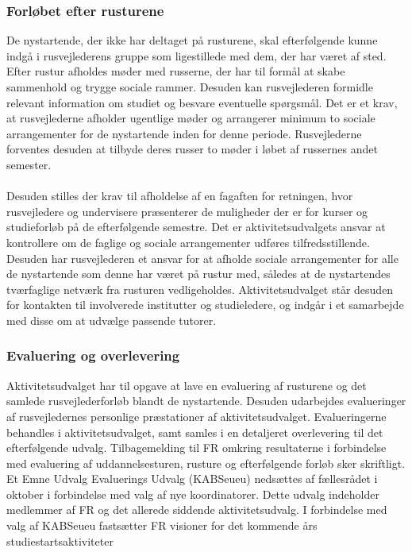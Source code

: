 \subsubsection{Forløbet efter rusturene}
De nystartende, der ikke har deltaget på rusturene, skal efterfølgende kunne indgå i rusvejlederens gruppe som ligestillede med dem, der har været af sted. Efter rustur afholdes møder med russerne, der har til formål at skabe sammenhold og trygge sociale rammer. Desuden kan rusvejlederen formidle relevant information om studiet og besvare eventuelle spørgsmål. Det er et krav, at rusvejlederne afholder ugentlige møder og arrangerer minimum to sociale arrangementer for de nystartende inden for denne periode. Rusvejlederne forventes desuden at tilbyde deres russer to møder i løbet af
russernes andet semester.\\
\\
Desuden stilles der krav til afholdelse af en fagaften for retningen, hvor rusvejledere og undervisere præsenterer de
muligheder der er for kurser og studieforløb på de efterfølgende semestre. Det er aktivitetsudvalgets ansvar at kontrollere om de faglige og sociale arrangementer udføres tilfredsstillende. Desuden har rusvejlederen et ansvar for at afholde sociale arrangementer for alle de nystartende som denne har været på rustur med, således at de nystartendes tværfaglige netværk fra rusturen vedligeholdes. Aktivitetsudvalget står desuden for kontakten til involverede institutter og studieledere, og indgår i et samarbejde med disse om at udvælge passende tutorer.

\subsubsection{Evaluering og overlevering}
Aktivitetsudvalget har til opgave at lave en evaluering af rusturene og det samlede rusvejlederforløb blandt de nystartende. Desuden udarbejdes evalueringer af rusvejledernes personlige præstationer af aktivitetsudvalget. Evalueringerne behandles i aktivitetsudvalget, samt samles i en detaljeret overlevering til det efterfølgende udvalg. Tilbagemelding til FR omkring resultaterne i forbindelse med evaluering af uddannelsesturen, rusture og efterfølgende forløb sker skriftligt. Et Emne Udvalg Evaluerings Udvalg (KABSeueu) nedsættes af fællesrådet i oktober i forbindelse med valg af nye koordinatorer. Dette udvalg indeholder medlemmer af FR og det allerede siddende aktivitetsudvalg. I forbindelse med valg af KABSeueu fastsætter FR visioner for det kommende års studiestartsaktiviteter